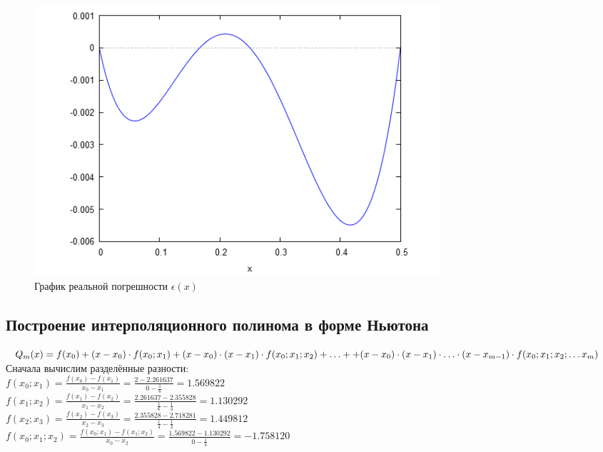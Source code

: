 \begin{figure}[H]
	\begin{center}
		\includegraphics[width=15cm]{lagrange.png}
		\caption{График реальной погрешности $\epsilon(x)$} 
		\label{pic:1}
	\end{center}
\end{figure}


\subsection{Построение интерполяционного полинома в форме Ньютона}

$Q_m(x) = f(x_0) + (x - x_0) \cdot f(x_0;x_1) + (x - x_0) \cdot (x - x_1) \cdot f(x_0;x_1;x_2) + \ldots + \\[1mm] + (x - x_0) \cdot (x - x_1) \cdot \ldots \cdot (x - x_{m-1}) \cdot f(x_0;x_1;x_2; \ldots x_m)$\\[3mm]

Сначала вычислим разделённые разности:\\[3mm]

$f(x_0; x_1) = \frac{f(x_0) - f(x_1)}{x_0 - x_1} = \frac{2 - 2.261637}{0 - \frac{1}{6}} = 1.569822$\\[1mm]

$f(x_1; x_2) = \frac{f(x_1) - f(x_2)}{x_1 - x_2} = \frac{2.261637 - 2.355828}{\frac{1}{6} - \frac{1}{4}} = 1.130292$\\[1mm]

$f(x_2; x_3) = \frac{f(x_2) - f(x_3)}{x_2 - x_3} = \frac{2.355828 - 2.718281}{\frac{1}{4} - \frac{1}{2}} = 1.449812$\\[1mm]

$f(x_0; x_1; x_2) = \frac{f(x_0; x_1) - f(x_1; x_2)}{x_0 - x_2} = \frac{1.569822 - 1.130292}{0 - \frac{1}{4}} = -1.758120$\\[1mm]

